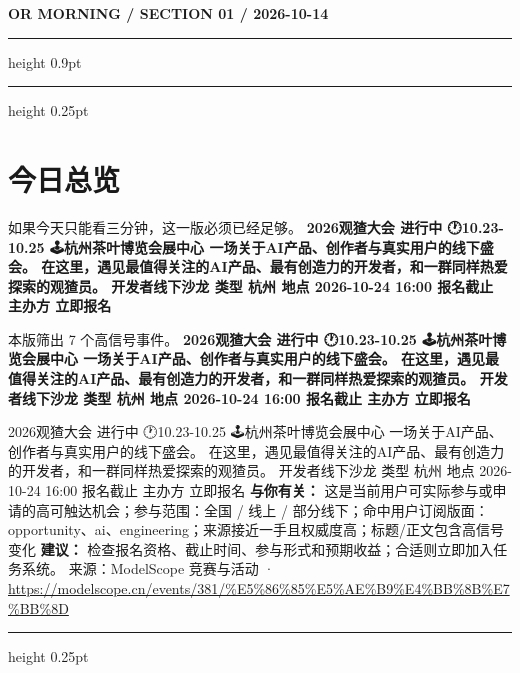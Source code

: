 \documentclass[10.5pt]{ctexart}
\begin{document}
{\small\bfseries OR MORNING / SECTION 01 / 2026-10-14}
\vspace{2mm}
\hrule height 0.9pt
\vspace{1.5mm}
\hrule height 0.25pt
\vspace{4mm}
\section*{今日总览}
{\color{ormuted} 如果今天只能看三分钟，这一版必须已经足够。}
\vspace{2mm}
{\fontsize{25}{29}\selectfont\bfseries 2026观猹大会 进行中 🕐10.23-10.25 🕹️杭州茶叶博览会展中心 一场关于AI产品、创作者与真实用户的线下盛会。 在这里，遇见最值得关注的AI产品、最有创造力的开发者，和一群同样热爱探索的观猹员。 开发者线下沙龙 类型 杭州 地点 2026-10-24 16:00 报名截止 主办方 立即报名}\par
\vspace{2mm}
{\large 本版筛出 7 个高信号事件。}
\vspace{3mm}
{\Large\bfseries 2026观猹大会 进行中 🕐10.23-10.25 🕹️杭州茶叶博览会展中心 一场关于AI产品、创作者与真实用户的线下盛会。 在这里，遇见最值得关注的AI产品、最有创造力的开发者，和一群同样热爱探索的观猹员。 开发者线下沙龙 类型 杭州 地点 2026-10-24 16:00 报名截止 主办方 立即报名}\par
2026观猹大会 进行中 🕐10.23-10.25 🕹️杭州茶叶博览会展中心 一场关于AI产品、创作者与真实用户的线下盛会。 在这里，遇见最值得关注的AI产品、最有创造力的开发者，和一群同样热爱探索的观猹员。 开发者线下沙龙 类型 杭州 地点 2026-10-24 16:00 报名截止 主办方 立即报名
\textbf{与你有关：} 这是当前用户可实际参与或申请的高可触达机会；参与范围：全国 / 线上 / 部分线下；命中用户订阅版面：opportunity、ai、engineering；来源接近一手且权威度高；标题/正文包含高信号变化
\textbf{建议：} 检查报名资格、截止时间、参与形式和预期收益；合适则立即加入任务系统。
{\footnotesize\color{ormuted} 来源：ModelScope 竞赛与活动 · \url{https://modelscope.cn/events/381/%E5%86%85%E5%AE%B9%E4%BB%8B%E7%BB%8D}}
\vspace{3mm}
\hrule height 0.25pt
\vspace{3mm}
\end{document}
